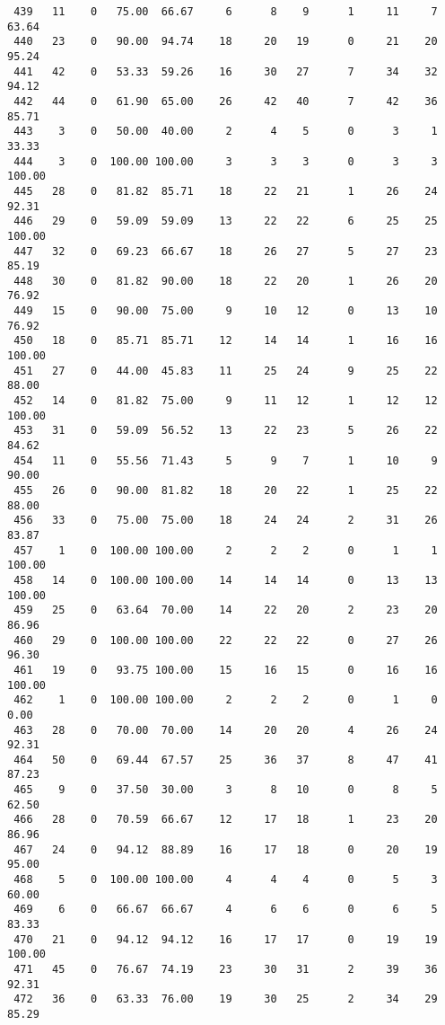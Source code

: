 \begin{verbatim}
 439   11    0   75.00  66.67     6      8    9      1     11     7    63.64
 440   23    0   90.00  94.74    18     20   19      0     21    20    95.24
 441   42    0   53.33  59.26    16     30   27      7     34    32    94.12
 442   44    0   61.90  65.00    26     42   40      7     42    36    85.71
 443    3    0   50.00  40.00     2      4    5      0      3     1    33.33
 444    3    0  100.00 100.00     3      3    3      0      3     3   100.00
 445   28    0   81.82  85.71    18     22   21      1     26    24    92.31
 446   29    0   59.09  59.09    13     22   22      6     25    25   100.00
 447   32    0   69.23  66.67    18     26   27      5     27    23    85.19
 448   30    0   81.82  90.00    18     22   20      1     26    20    76.92
 449   15    0   90.00  75.00     9     10   12      0     13    10    76.92
 450   18    0   85.71  85.71    12     14   14      1     16    16   100.00
 451   27    0   44.00  45.83    11     25   24      9     25    22    88.00
 452   14    0   81.82  75.00     9     11   12      1     12    12   100.00
 453   31    0   59.09  56.52    13     22   23      5     26    22    84.62
 454   11    0   55.56  71.43     5      9    7      1     10     9    90.00
 455   26    0   90.00  81.82    18     20   22      1     25    22    88.00
 456   33    0   75.00  75.00    18     24   24      2     31    26    83.87
 457    1    0  100.00 100.00     2      2    2      0      1     1   100.00
 458   14    0  100.00 100.00    14     14   14      0     13    13   100.00
 459   25    0   63.64  70.00    14     22   20      2     23    20    86.96
 460   29    0  100.00 100.00    22     22   22      0     27    26    96.30
 461   19    0   93.75 100.00    15     16   15      0     16    16   100.00
 462    1    0  100.00 100.00     2      2    2      0      1     0     0.00
 463   28    0   70.00  70.00    14     20   20      4     26    24    92.31
 464   50    0   69.44  67.57    25     36   37      8     47    41    87.23
 465    9    0   37.50  30.00     3      8   10      0      8     5    62.50
 466   28    0   70.59  66.67    12     17   18      1     23    20    86.96
 467   24    0   94.12  88.89    16     17   18      0     20    19    95.00
 468    5    0  100.00 100.00     4      4    4      0      5     3    60.00
 469    6    0   66.67  66.67     4      6    6      0      6     5    83.33
 470   21    0   94.12  94.12    16     17   17      0     19    19   100.00
 471   45    0   76.67  74.19    23     30   31      2     39    36    92.31
 472   36    0   63.33  76.00    19     30   25      2     34    29    85.29

\end{verbatim}
